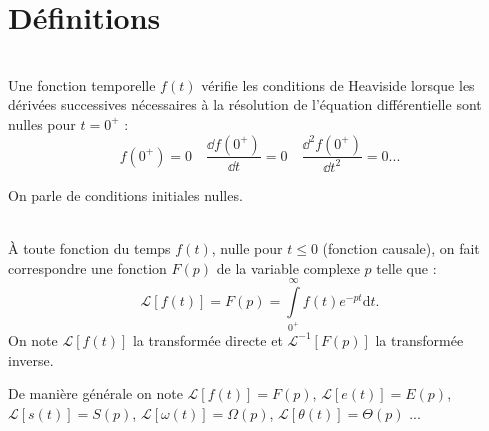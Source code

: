 \fichetrue
\proftrue
\tdfalse
\coursfalse



\def\xxnumchapitre{Révisions 2 \vspace{.2cm}}
\def\xxchapitre{\hspace{.12cm} Modéliser les systèmes asservis -- Transformée de Laplace}

\def\xxposongletx{2}
\def\xxposonglettext{1.45}
\def\xxposonglety{19}%

\def\xxonglet{Cy 01 -- Rév 2}

\def\xxactivite{Fiche}


\def\xxpied{%
Cycle 01 -- Modéliser le comportement des systèmes multiphysiques\\
Révision 2 -- \xxactivite%
}

\setcounter{secnumdepth}{5}

\iflivret

\else

\fi
\vspace{.5cm}
\pagestyle{fancy}
\thispagestyle{plain}
\setcounter{section}{0}


\section{Définitions}


\begin{defi} ~\\

Une fonction temporelle $f(t)$ vérifie les conditions de Heaviside lorsque les dérivées successives nécessaires à la résolution de l'équation différentielle sont nulles pour $t={0^{+}}$ :
$$
f({0^{+}})=0 \quad \dfrac{\dd f({0^{+}})}{\dd t} = 0 \quad \dfrac{\dd^2f({0^{+}})}{\dd t^2} = 0 ...
$$

On parle de conditions initiales nulles.

\end{defi}

\begin{defi} ~\\
À toute fonction du temps $f(t)$, nulle pour $t\leq0$ (fonction causale), on fait correspondre une fonction $F(p)$ de la variable complexe $p$ telle que :
$$
\mathcal{L}\left[f(t)\right] = F(p)=\int\limits_{0^{+}}^\infty f(t)e^{-pt}\text{d}t.
$$
On note $\mathcal{L}\left[f(t)\right]$ la transformée directe et $\mathcal{L}^{-1}\left[F(p)\right]$ la transformée inverse.

\noindent De manière générale on note 
$\mathcal{L}\left[f(t)\right] = F(p)$,
$\mathcal{L}\left[e(t)\right] = E(p)$,
$\mathcal{L}\left[s(t)\right] = S(p)$,
$\mathcal{L}\left[\omega(t)\right] = \Omega(p)$,
$\mathcal{L}\left[\theta(t)\right] = \Theta(p)$ ...

\end{defi}


